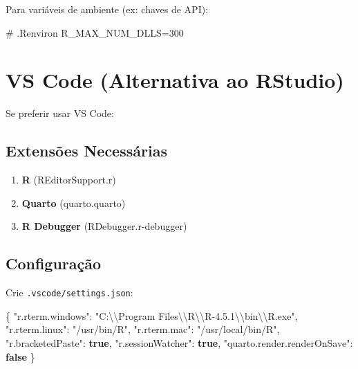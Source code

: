 \documentclass[
  letterpaper,
]{book}
\newenvironment{Shaded}{\begin{snugshade}}{\end{snugshade}}
\newcommand{\CharTok}[1]{\textcolor[rgb]{0.13,0.47,0.30}{#1}}
\newcommand{\CommentTok}[1]{\textcolor[rgb]{0.37,0.37,0.37}{#1}}
\newcommand{\DataTypeTok}[1]{\textcolor[rgb]{0.68,0.00,0.00}{#1}}
\newcommand{\FunctionTok}[1]{\textcolor[rgb]{0.28,0.35,0.67}{#1}}
\newcommand{\KeywordTok}[1]{\textcolor[rgb]{0.00,0.23,0.31}{\textbf{#1}}}
\newcommand{\NormalTok}[1]{\textcolor[rgb]{0.00,0.23,0.31}{#1}}
\newcommand{\OperatorTok}[1]{\textcolor[rgb]{0.37,0.37,0.37}{#1}}
\newcommand{\StringTok}[1]{\textcolor[rgb]{0.13,0.47,0.30}{#1}}
\newcommand{\VariableTok}[1]{\textcolor[rgb]{0.07,0.07,0.07}{#1}}
\providecommand{\tightlist}{%
  \setlength{\itemsep}{0pt}\setlength{\parskip}{0pt}}\usepackage{longtable,booktabs,array}
\begin{document}
Para variáveis de ambiente (ex: chaves de API):

\begin{Shaded}
\begin{Highlighting}[]
\CommentTok{\# .Renviron}
\VariableTok{R\_MAX\_NUM\_DLLS}\OperatorTok{=}\NormalTok{300}
\end{Highlighting}
\end{Shaded}

\section*{VS Code (Alternativa ao
RStudio)}\label{vs-code-alternativa-ao-rstudio}


Se preferir usar VS Code:

\subsection*{Extensões Necessárias}\label{extensuxf5es-necessuxe1rias}

\begin{enumerate}
\def\labelenumi{\arabic{enumi}.}
\tightlist
\item
  \textbf{R} (REditorSupport.r)
\item
  \textbf{Quarto} (quarto.quarto)
\item
  \textbf{R Debugger} (RDebugger.r-debugger)
\end{enumerate}

\subsection*{Configuração}\label{configurauxe7uxe3o}

Crie \texttt{.vscode/settings.json}:

\begin{Shaded}
\begin{Highlighting}[]
\FunctionTok{\{}
  \DataTypeTok{"r.rterm.windows"}\FunctionTok{:} \StringTok{"C:}\CharTok{\textbackslash{}\textbackslash{}}\StringTok{Program Files}\CharTok{\textbackslash{}\textbackslash{}}\StringTok{R}\CharTok{\textbackslash{}\textbackslash{}}\StringTok{R{-}4.5.1}\CharTok{\textbackslash{}\textbackslash{}}\StringTok{bin}\CharTok{\textbackslash{}\textbackslash{}}\StringTok{R.exe"}\FunctionTok{,}
  \DataTypeTok{"r.rterm.linux"}\FunctionTok{:} \StringTok{"/usr/bin/R"}\FunctionTok{,}
  \DataTypeTok{"r.rterm.mac"}\FunctionTok{:} \StringTok{"/usr/local/bin/R"}\FunctionTok{,}
  \DataTypeTok{"r.bracketedPaste"}\FunctionTok{:} \KeywordTok{true}\FunctionTok{,}
  \DataTypeTok{"r.sessionWatcher"}\FunctionTok{:} \KeywordTok{true}\FunctionTok{,}
  \DataTypeTok{"quarto.render.renderOnSave"}\FunctionTok{:} \KeywordTok{false}
\FunctionTok{\}}
\end{Highlighting}
\end{Shaded}
\end{document}

